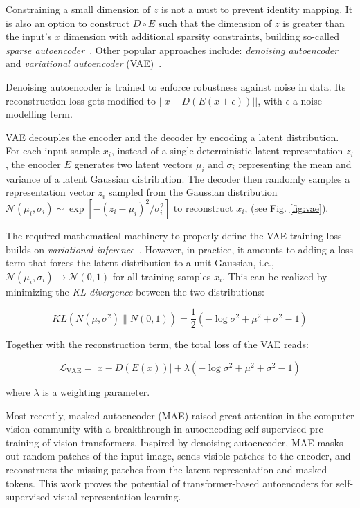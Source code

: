 \documentclass[lettersize,journal]{IEEEtran}
\begin{document}
Constraining a small dimension of $z$ is not a must to prevent identity mapping. It is also an option to construct $D\circ E$ such that the dimension of $z$ is greater than the input's $x$ dimension with additional sparsity constraints, building so-called \textit{sparse autoencoder}~\cite{ng2011sparse}. Other popular approaches include: \textit{denoising autoencoder}~\cite{vincent2010stacked} and \textit{variational autoencoder} (VAE)~\cite{kingma2013auto}.

Denoising autoencoder is trained to enforce robustness against noise in data. Its reconstruction loss
gets modified to $\vert\vert x - D(E(x+\epsilon)) \vert\vert$, with $\epsilon$ a noise modelling term. 

VAE decouples the encoder and the decoder by encoding a latent distribution. For each input sample $x_i$, instead of a single deterministic latent representation $z_i$, the encoder $E$ generates two latent vectors $\mu_i$ and $\sigma_i$ representing the mean and variance of a latent Gaussian distribution. The decoder then randomly samples a representation vector $z_i$ sampled from the Gaussian distribution $\mathcal{N}(\mu_i,\sigma_i)\sim\exp\left[-(z_i-\mu_i)^2/\sigma_i^2\right]$ to reconstruct $x_i$, (see Fig. \ref{fig:vae}).

The required mathematical machinery to properly define the VAE training loss builds on \textit{variational inference}~\cite{blei2017variational}. However, in practice, it amounts to adding a loss term that forces the latent distribution to a unit Gaussian, i.e., $\mathcal{N}(\mu_i,\sigma_i)\to\mathcal{N}(0,1)$ for all training samples $x_i$. This can be realized by minimizing the \textit{KL divergence} between the two distributions:

\begin{equation}
KL(N(\mu, \sigma^{2}) \| N(0,1))=\frac{1}{2}(-\log \sigma^{2}+\mu^{2}+\sigma^{2}-1)
\end{equation}

\noindent Together with the reconstruction term, the total loss  of the VAE reads:

\begin{equation}
\label{eq:VAE}
\mathcal{L}_\text{VAE}=
    \left\vert x-D(E(x))\right\vert + \lambda(-\log \sigma^{2}+\mu^{2}+\sigma^{2}-1)
\end{equation}

\noindent where $\lambda$ is a weighting parameter.

Most recently, masked autoencoder (MAE) \cite{he2021masked} raised great attention in the computer vision community with a breakthrough in autoencoding self-supervised pre-training of vision transformers. Inspired by denoising autoencoder, MAE masks out random patches of the input image, sends visible patches to the encoder, and reconstructs the missing patches from the latent representation and masked tokens. This work proves the potential of transformer-based autoencoders for self-supervised visual representation learning.
\end{document}
